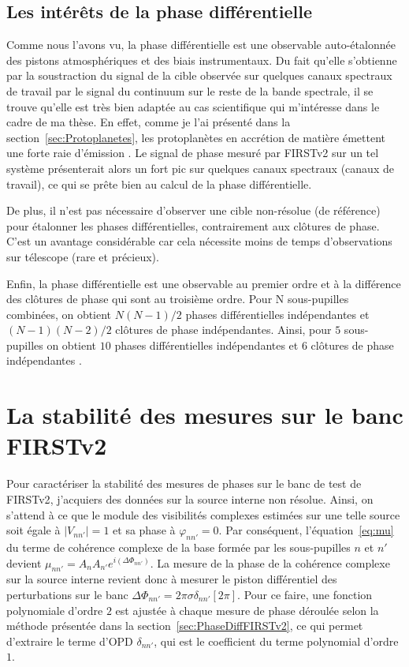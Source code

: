 \subsection{Les intérêts de la phase différentielle}

Comme nous l'avons vu, la phase différentielle est une observable auto-étalonnée des pistons atmosphériques et des biais instrumentaux. Du fait qu'elle s'obtienne par la soustraction du signal de la cible observée sur quelques canaux spectraux de travail par le signal du continuum sur le reste de la bande spectrale, il se trouve qu'elle est très bien adaptée au cas scientifique qui m'intéresse dans le cadre de ma thèse. En effet, comme je l'ai présenté dans la section~\ref{sec:Protoplanetes}, les protoplanètes en accrétion de matière émettent une forte raie d'émission \ha. Le signal de phase mesuré par \ac{FIRSTv2} sur un tel système présenterait alors un fort pic sur quelques canaux spectraux (canaux de travail), ce qui se prête bien au calcul de la phase différentielle.

De plus, il n'est pas nécessaire d'observer une cible non-résolue (de référence) pour étalonner les phases différentielles, contrairement aux clôtures de phase. C'est un avantage considérable car cela nécessite moins de temps d'observations sur télescope (rare et précieux).

Enfin, la phase différentielle est une observable au premier ordre et à la différence des clôtures de phase qui sont au troisième ordre. Pour N sous-pupilles combinées, on obtient $N(N-1)/2$ phases différentielles indépendantes et $(N-1)(N-2)/2$ clôtures de phase indépendantes. Ainsi, pour $5$ sous-pupilles on obtient $10$ phases différentielles indépendantes et $6$ clôtures de phase indépendantes \citep{millour2006}.


\section{La stabilité des mesures sur le banc FIRSTv2}

Pour caractériser la stabilité des mesures de phases sur le banc de test de \ac{FIRSTv2}, j'acquiers des données sur la source interne non résolue. Ainsi, on s'attend à ce que le module des visibilités complexes estimées sur une telle source soit égale à $|V_{nn'}| = 1$ et sa phase à $\varphi_{nn'} = 0$. Par conséquent, l'équation~\ref{eq:mu} du terme de cohérence complexe de la base formée par les sous-pupilles $n$ et $n'$ devient $\mu_{nn'} = A_n A_{n'} e^{i(\Delta\Phi_{nn'})}$. La mesure de la phase de la cohérence complexe sur la source interne revient donc à mesurer le piston différentiel des perturbations sur le banc $\Delta\Phi_{nn'} = 2 \pi \sigma \delta_{nn'} [2 \pi]$. Pour ce faire, une fonction polynomiale d'ordre $2$ est ajustée à chaque mesure de phase déroulée selon la méthode présentée dans la section~\ref{sec:PhaseDiffFIRSTv2}, ce qui permet d'extraire le terme d'\ac{OPD} $\delta_{nn'}$, qui est le coefficient du terme polynomial d'ordre $1$.

